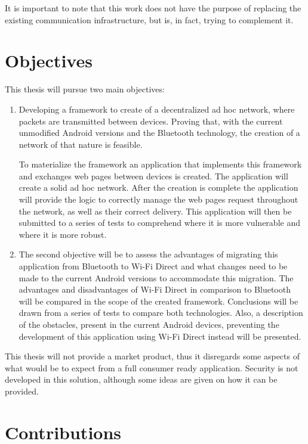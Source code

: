 It is important to note that this work does not have the purpose of replacing the existing communication infrastructure, but is, in fact, trying to complement it.

\section{Objectives}

This thesis will pursue two main objectives:

\begin{enumerate}
	\item 
	Developing a framework to create of a decentralized ad hoc network, where packets are transmitted between devices. Proving that, with the current unmodified Android versions and the Bluetooth technology, the creation of a network of that nature is feasible.
	
	To materialize the framework an application that implements this framework and exchanges web pages between devices is created. The application will create a solid ad hoc network. After the creation is complete the application will provide the logic to correctly manage the web pages request throughout the network, as well as their correct delivery. This application will then be submitted to a series of tests to comprehend where it is more vulnerable and where it is more robust.
	
	\item 
	The second objective will be to assess the advantages of migrating this application from Bluetooth to Wi-Fi Direct and what changes need to be made to the current Android versions to accommodate this migration. The advantages and disadvantages of Wi-Fi Direct in comparison to Bluetooth will be compared in the scope of the created framework. Conclusions will be drawn from a series of tests to compare both technologies. Also, a description of the obstacles, present in the current Android devices, preventing the development of this application using Wi-Fi Direct instead will be presented.
	
\end{enumerate}

This thesis will not provide a market product, thus it disregards some aspects of what would be to expect from a full consumer ready application. Security is not developed in this solution, although some ideas are given on how it can be provided.

\section{Contributions}

